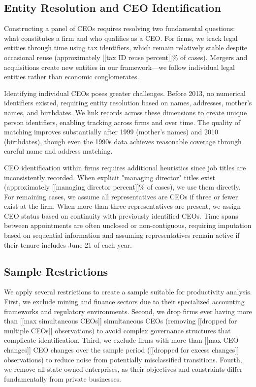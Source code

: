 \documentclass[11pt,a4paper]{article}
\begin{document}
\subsection{Entity Resolution and CEO Identification}

Constructing a panel of CEOs requires resolving two fundamental questions: what constitutes a firm and who qualifies as a CEO. For firms, we track legal entities through time using tax identifiers, which remain relatively stable despite occasional reuse (approximately [[tax ID reuse percent]]\% of cases). Mergers and acquisitions create new entities in our framework—we follow individual legal entities rather than economic conglomerates.

Identifying individual CEOs poses greater challenges. Before 2013, no numerical identifiers existed, requiring entity resolution based on names, addresses, mother's names, and birthdates. We link records across these dimensions to create unique person identifiers, enabling tracking across firms and over time. The quality of matching improves substantially after 1999 (mother's names) and 2010 (birthdates), though even the 1990s data achieves reasonable coverage through careful name and address matching.

CEO identification within firms requires additional heuristics since job titles are inconsistently recorded. When explicit "managing director" titles exist (approximately [[managing director percent]]\% of cases), we use them directly. For remaining cases, we assume all representatives are CEOs if three or fewer exist at the firm. When more than three representatives are present, we assign CEO status based on continuity with previously identified CEOs. Time spans between appointments are often unclosed or non-contiguous, requiring imputation based on sequential information and assuming representatives remain active if their tenure includes June 21 of each year.

\subsection{Sample Restrictions}

We apply several restrictions to create a sample suitable for productivity analysis. First, we exclude mining and finance sectors due to their specialized accounting frameworks and regulatory environments. Second, we drop firms ever having more than [[max simultaneous CEOs]] simultaneous CEOs (removing [[dropped for multiple CEOs]] observations) to avoid complex governance structures that complicate identification. Third, we exclude firms with more than [[max CEO changes]] CEO changes over the sample period ([[dropped for excess changes]] observations) to reduce noise from potentially misclassified transitions. Fourth, we remove all state-owned enterprises, as their objectives and constraints differ fundamentally from private businesses.
\end{document}
